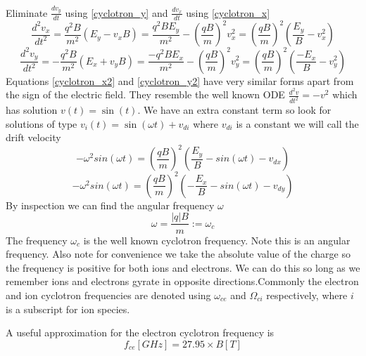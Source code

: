 Eliminate $\frac{dv_y}{dt}$ using \eqref{cyclotron_y} and $\frac{dv_x}{dt}$ using \eqref{cyclotron_x}
\begin{equation}\label{cyclotron_x2}
	\frac{d^2v_x}{dt^2}=\frac{q^2B}{m^2}(E_y-v_xB)=\frac{q^2BE_y}{m^2}-\left(\frac{qB}{m}\right)^2v_x^2=\left(\frac{qB}{m}\right)^2\left(\frac{E_y}{B}-v_x^2\right)
\end{equation}
\begin{equation}\label{cyclotron_y2}
	\frac{d^2v_y}{dt^2}=-\frac{q^2B}{m^2}(E_x+v_yB)=\frac{-q^2BE_x}{m^2}-\left(\frac{qB}{m}\right)^2v_y^2=\left(\frac{qB}{m}\right)^2\left(\frac{-E_x}{B}-v_y^2\right)
\end{equation}
Equations \eqref{cyclotron_x2} and \eqref{cyclotron_y2} have very similar forms apart from the sign of the electric field. They resemble the well known ODE $\frac{d^2v}{dt^2}=-v^2$ which has solution $v(t)=\sin(t)$. We have an extra constant term so look for solutions of type $v_i(t)=\sin(\omega t)+v_{di}$ where $v_{di}$ is a constant we will call the drift velocity
\begin{equation}
	-\omega^2sin(\omega t)=\left(\frac{qB}{m}\right)^2\left(\frac{E_y}{B}-sin(\omega t)-v_{dx}\right)
\end{equation}
\begin{equation}
	-\omega^2sin(\omega t)=\left(\frac{qB}{m}\right)^2\left(-\frac{E_x}{B}-sin(\omega t)-v_{dy}\right)
\end{equation}
By inspection we can find the angular frequency $\omega$
\begin{equation}
	\omega=\frac{|q|B}{m}:=\omega_c
\end{equation}
The frequency $\omega_c$ is the well known cyclotron frequency. Note this is an angular frequency. Also note for convenience we take the absolute value of the charge so the frequency is positive for both ions and electrons. We can do this so long as we remember ions and electrons gyrate in opposite directions.Commonly the electron and ion cyclotron frequencies are denoted using $\omega_{ce}$ and $\Omega_{ci}$ respectively, where $i$ is a subscript for ion species.

A useful approximation for the electron cyclotron frequency is
\begin{equation}
	f_{ce}[GHz] = 27.95 \times B[T]
\end{equation}

